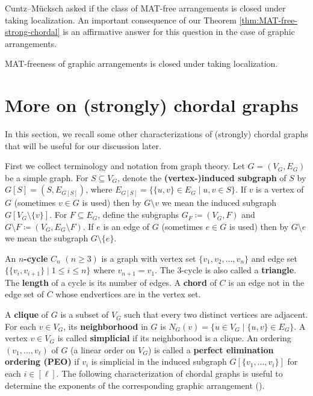 Cuntz--M{\"u}cksch  \cite[Problem 48]{CM20} asked if the class of MAT-free arrangements is closed under taking localization.  
 An important consequence of our Theorem \ref{thm:MAT-free-strong-chordal} is an affirmative answer for this question in the case of graphic arrangements.
 \begin{corollary}
 \label{cor:close-localization}
MAT-freeness of graphic arrangements is closed under taking localization.  
\end{corollary}


\section{More on (strongly) chordal graphs}
\label{sec:more}
 \quad
In this section, we recall some other characterizations of (strongly) chordal graphs that will be useful for our discussion later.

First we collect terminology and notation from graph theory. 
Let $ G = (V_{G}, E_{G}) $ be a simple graph. 
For $S \subseteq V_{G}$, denote  the \textbf{(vertex-)induced subgraph} of $S$ by $G[S] = (S, E_{G[S]})$, where $E_{G[S]} =\{ \{u,v\} \in E_G \mid u, v \in S\}$.
If $v$ is a vertex of $G$ (sometimes $v \in G$ is used) then by $G\setminus  v$ we mean the induced subgraph $G[V_G\setminus\{v\}]$. 
For $ F \subseteq E_{G} $, define the subgraphs $ G_{F} \coloneqq (V_{G}, F) $ and $ G\setminus F \coloneqq (V_{G}, E_{G} \setminus F) $.
If $e$ is an edge of $G$ (sometimes $e \in G$ is used) then by $G\setminus e$ we mean the subgraph $G \setminus \{e\} $. 

An \textbf{$n$-cycle} $C_{n}$ $(n\ge3)$ is a graph with vertex set $\{v_1, v_2, \ldots, v_n\}$ and edge set~$\{\{v_i, v_{i+1}\} \mid 1 \le i\le n\}$ where $v_{n+1}=v_1$. 
The $3$-cycle is also called a \textbf{triangle}.
The  \textbf{length}  of a cycle is its number of edges. 
A \textbf{chord} of $C$ is an edge not in the edge set of $C$ whose endvertices are in the vertex set.

A \textbf{clique} of $G$ is a subset of $V_{G}$ such that every two distinct vertices are adjacent. 
For each $v \in V_{G}$, its  \textbf{neighborhood} in $G$ is $ N_{G}(v) =\{ u \in V_{G} \mid \{u,v\} \in E_G\}$. 
A vertex $ v \in V_{G} $ is called \textbf{simplicial} if  its neighborhood is a clique. 
An ordering~$ (v_{1}, \dots, v_{\ell}) $ of $ G $ (a linear order on $ V_{G} $) is called a \textbf{perfect elimination ordering (PEO)}   if $ v_{i} $ is simplicial in the induced subgraph $ G[\{v_{1}, \dots, v_{i}\}] $ for each $ i \in [\ell] $. 
The following characterization of chordal graphs is useful to determine the exponents of the corresponding graphic arrangement (\eg  \cite[Lemma 3.4]{ER94}).

